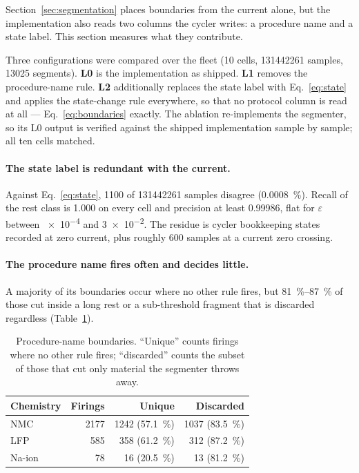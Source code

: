 \documentclass[preprint,3p,number]{elsarticle}
\begin{document}
Section~\ref{sec:segmentation} places boundaries from the current alone, but the
implementation also reads two columns the cycler writes: a procedure name and a
state label. This section measures what they contribute.

Three configurations were compared over the fleet (\num{10} cells,
\num{131442261} samples, \num{13025} segments). \textbf{L0} is the implementation
as shipped. \textbf{L1} removes the procedure-name rule. \textbf{L2} additionally
replaces the state label with Eq.~\eqref{eq:state} and applies the state-change
rule everywhere, so that no protocol column is read at all --- Eq.~\eqref{eq:boundaries}
exactly. The ablation re-implements the segmenter, so its L0 output is verified
against the shipped implementation sample by sample; all ten cells matched.

\paragraph{The state label is redundant with the current.}
Against Eq.~\eqref{eq:state}, \num{1100} of \num{131442261} samples disagree
(\SI{0.0008}{\percent}). Recall of the rest class is \num{1.000} on every cell
and precision at least \num{0.99986}, flat for $\varepsilon$ between \num{e-4}
and \num{3e-2}. The residue is cycler bookkeeping states recorded at zero
current, plus roughly \num{600} samples at a current zero crossing.

\paragraph{The procedure name fires often and decides little.}
A majority of its boundaries occur where no other rule fires, but
\SIrange{81}{87}{\percent} of those cut inside a long rest or a sub-threshold
fragment that is discarded regardless (Table~\ref{tab:rule3}).

\begin{table}[t]
\centering
\caption{Procedure-name boundaries. ``Unique'' counts firings where no other
rule fires; ``discarded'' counts the subset of those that cut only material the
segmenter throws away.}
\label{tab:rule3}
\begin{tabular}{lrrr}
\toprule
Chemistry & Firings & Unique & Discarded \\
\midrule
NMC    & \num{2177} & \num{1242} (\SI{57.1}{\percent}) & \num{1037} (\SI{83.5}{\percent}) \\
LFP    & \num{585}  & \num{358} (\SI{61.2}{\percent})  & \num{312} (\SI{87.2}{\percent}) \\
Na-ion & \num{78}   & \num{16} (\SI{20.5}{\percent})   & \num{13} (\SI{81.2}{\percent}) \\
\bottomrule
\end{tabular}
\end{table}
\end{document}
